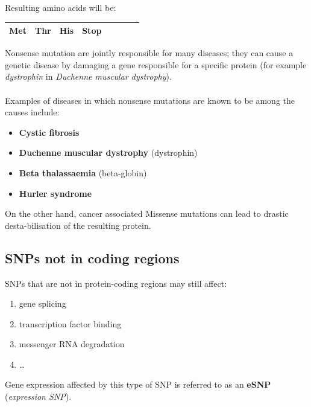 \vspace{15mm}

Resulting amino acids will be:

\vspace{5mm}

\begin{tabular}{|l|l|l|l|l|l|rl|}
\hline
Met         &	Thr         &	His         &	\textbf{Stop}         &	            &	            &	     	&       \\
\hline
\end{tabular}

\vspace{30mm}

Nonsense mutation are jointly responsible for many diseases; they can cause a genetic disease by damaging a gene responsible for a specific protein (for example \emph{dystrophin} in \emph{Duchenne muscular dystrophy}). 
\\
\\Examples of diseases in which nonsense mutations are known to be among the causes include:

\begin{itemize}
	\item \textbf{Cystic fibrosis}
	\item \textbf{Duchenne muscular dystrophy} (dystrophin)
	\item \textbf{Beta thalassaemia} (beta-globin)
	\item \textbf{Hurler syndrome}
	\end{itemize}

On the other hand, cancer associated Missense mutations can lead to drastic desta-bilisation of the resulting protein.


\subsection{SNPs not in coding regions}

SNPs that are not in protein-coding regions may still affect:

\begin{enumerate}
	\item gene splicing
	\item transcription factor binding
	\item messenger RNA degradation
	\item \ldots
	\end{enumerate}

Gene expression affected by this type of SNP is referred to as an \textbf{eSNP} (\emph{expression SNP}).